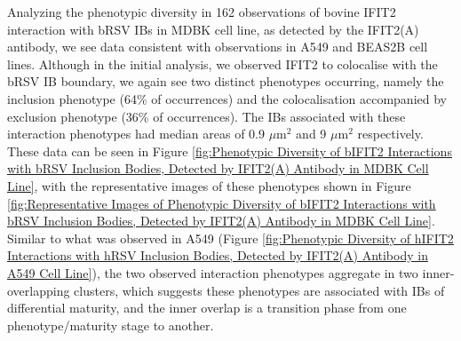 Analyzing the phenotypic diversity in 162 observations of bovine IFIT2 interaction with bRSV IBs in MDBK cell line, as detected by the IFIT2(A) antibody, we see data consistent with observations in A549 and BEAS2B cell lines. Although in the initial analysis, we observed IFIT2 to colocalise with the bRSV IB boundary, we again see two distinct phenotypes occurring, namely the inclusion phenotype (64\% of occurrences) and the colocalisation accompanied by exclusion phenotype (36\% of occurrences). The IBs associated with these interaction phenotypes had median areas of 0.9 \(\mu \mbox{m}^2\) and 9 \(\mu \mbox{m}^2\) respectively. These data can be seen in Figure \ref{fig:Phenotypic Diversity of bIFIT2 Interactions with bRSV Inclusion Bodies, Detected by IFIT2(A) Antibody in MDBK Cell Line}, with the representative images of these phenotypes shown in Figure \ref{fig:Representative Images of Phenotypic Diversity of bIFIT2 Interactions with bRSV Inclusion Bodies, Detected by IFIT2(A) Antibody in MDBK Cell Line}. Similar to what was observed in A549 (Figure \ref{fig:Phenotypic Diversity of hIFIT2 Interactions with hRSV Inclusion Bodies, Detected by IFIT2(A) Antibody in A549 Cell Line}), the two observed interaction phenotypes aggregate in two inner-overlapping clusters, which suggests these phenotypes are associated with IBs of differential maturity, and the inner overlap is a transition phase from one phenotype/maturity stage to another.

